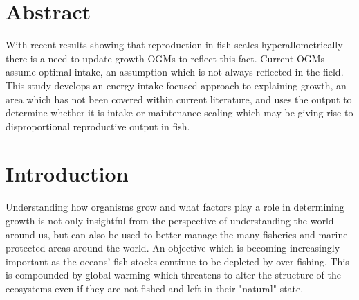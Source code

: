 \documentclass[a4paper, 11pt, hidelinks]{article} %
\begin{document}
	

	\section*{Abstract}
	\linenumbers
	 
	With recent results showing that reproduction in fish scales hyperallometrically there is a need to update growth OGMs to reflect this fact.  Current OGMs assume optimal intake, an assumption which is not always reflected in the field.  This study develops an energy intake focused approach to explaining growth, an area which has not been covered within current literature, and uses the output to determine whether it is intake or maintenance scaling which may be giving rise to disproportional reproductive output in fish.
	
	
%	
	
	
	\nolinenumbers
	
	
	\tableofcontents
	\newpage

\section{Introduction}
	\linenumbers
	Understanding how organisms grow and what factors play a role in determining growth is not only insightful from the perspective of understanding the world around us, but can also be used to better manage the many fisheries and marine protected areas around the world.  An objective which is becoming increasingly important as the oceans' fish stocks continue to be depleted by over fishing. 
	This is compounded by global warming which threatens to alter the structure of the ecosystems even if they are not fished and left in their "natural" state. 
	
\end{document}
